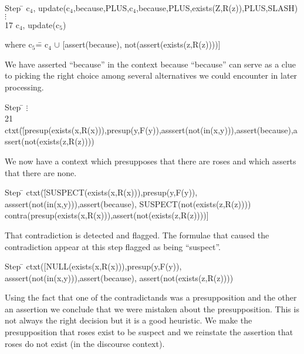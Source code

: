 \documentclass{article}
\begin{document}
\begin{tabbing}
Step \= \> c$_4$,
update(c$_4$,because,PLUS,c$_4$,because,PLUS,exists(Z,R(z)),PLUS,SLASH)\\
\> $\vdots$\\

17\> c$_4$, update(c$_5$)
\end{tabbing}

\begin{tabbing}
where c$_5$\= = c$_4$ $\cup$ [assert(because), not(assert(exists(z,R(z))))]
\end{tabbing}

We have asserted ``because'' in the context because ``because'' can
serve as a clue to picking the right choice among several alternatives
we could encounter in later processing.


\begin{tabbing}
Step \= \kill
\> $\vdots$\\

21\> ctxt(\=[presup(exists(x,R(x))),presup(y,F(y)),asssert(not(in(x,y))),assert(because),assert(not(exists(z,R(z))))
\end{tabbing}

We now have a context which presupposes that there are roses and which
asserts that there are none.

\begin{tabbing}
Step \= \> ctxt(\=[SUSPECT(exists(x,R(x))),presup(y,F(y)),
asssert(not(in(x,y))),assert(because),
SUSPECT(not(exists(z,R(z))))\\
\> \>contra(presup(exists(x,R(x))),assert(not(exists(z,R(z))))]
\end{tabbing}

That contradiction is detected and flagged. The formulae that caused
the contradiction appear at this step flagged as being ``suspect''.

\begin{tabbing}
Step \= \> ctxt([NULL(exists(x,R(x))),presup(y,F(y)),
asssert(not(in(x,y))),assert(because), assert(not(exists(z,R(z))))
\end{tabbing}

Using the fact that one of the contradictands was a presupposition and
the other an assertion we conclude that we were mistaken about the
presupposition. This is not always the right decision but it is a good
heuristic. We make the presupposition that roses exist to be suspect
and we reinstate the assertion that roses do not exist (in the
discourse context).
\end{document}
